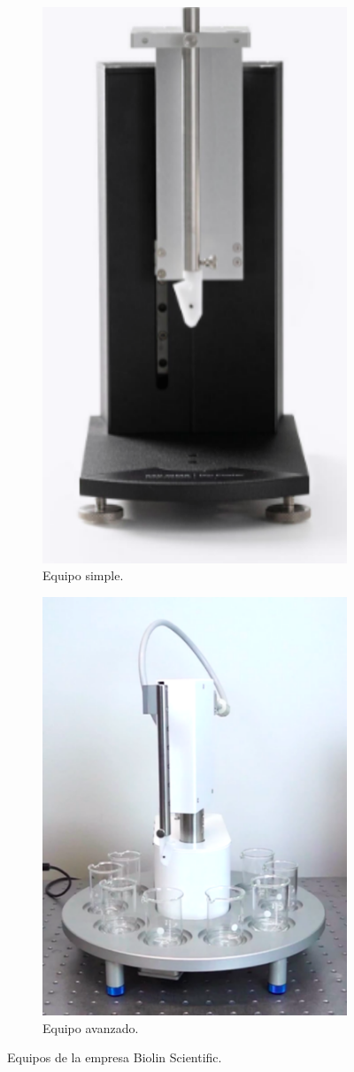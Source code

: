 \begin{figure}[!htpb]
     \centering
     \begin{subfigure}[b]{0.4\textwidth}
         \centering
         \includegraphics[width=.55\textwidth]{./Figures/dip_biolin.pdf}
         \caption{Equipo simple.}
         \label{fig:dip_biolin}
     \end{subfigure}
     \hfill
     \begin{subfigure}[b]{0.4\textwidth}
         \centering
         \includegraphics[width=.75\textwidth]{./Figures/dip_biolin_2.pdf}
         \caption{Equipo avanzado.}
         \label{fig:dip_biolin_2}
     \end{subfigure}
     \hfill
        \caption{Equipos de la empresa Biolin Scientific.}
        \label{fig:equipos_biolin}
\end{figure}

